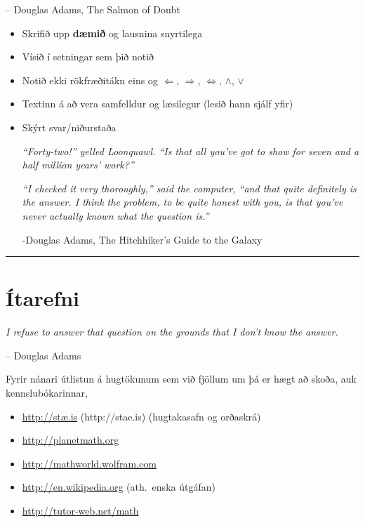 \documentclass[b5paper,11pt,icelandic]{sphinxmanual}
\begin{document}
-- Douglas Adams, The Salmon of Doubt
\begin{itemize}
\item {} 
Skrifið upp \textbf{dæmið} og lausnina snyrtilega

\item {} 
Vísið í setningar sem þið notið

\item {} 
Notið ekki rökfræðitákn eins og \(\Leftarrow\),
\(\Rightarrow\), \(\Leftrightarrow\), \(\wedge\),
\(\vee\)

\item {} 
Textinn á að vera samfelldur og læsilegur (lesið hann sjálf yfir)

\item {} 
Skýrt svar/niðurstaða

\emph{“Forty-two!” yelled Loonquawl. “Is that all you’ve got to show for
seven and a half million years’ work?”}

\emph{“I checked it very thoroughly,” said the computer, “and that quite
definitely is the answer. I think the problem, to be quite honest with
you, is that you’ve never actually known what the question is.”}

-Douglas Adams, The Hitchhiker's Guide to the Galaxy

\end{itemize}


\bigskip\hrule{}\bigskip

\newpage

\section{Ítarefni}
\label{vidauki:itarefni}
\emph{I refuse to answer that question on the grounds that I don't know the answer.}

-- Douglas Adams

Fyrir nánari útlistun á hugtökunum sem við fjöllum um þá er hægt að skoða,
auk kennslubókarinnar,
\begin{itemize}
\item {} 
\href{http://stae.is}{http://stæ.is} (http://stae.is) (hugtakasafn og orðaskrá)

\item {} 
\url{http://planetmath.org}

\item {} 
\url{http://mathworld.wolfram.com}

\item {} 
\url{http://en.wikipedia.org} (ath. enska útgáfan)

\item {} 
\url{http://tutor-web.net/math}

\end{itemize}
\end{document}
